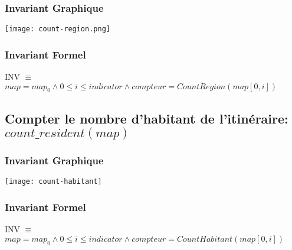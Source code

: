 \subsubsection{Invariant Graphique}

\addvspace{40px}
\begin{center}
    \texttt{[image: count-region.png]}
\end{center}
\addvspace{40px}

\subsubsection{Invariant Formel}

INV $\equiv$ $map=map_0 \land 0 \le i \le indicator \land compteur=CountRegion(map[0, i])$


\subsection{Compter le nombre d'habitant de l'itinéraire: $count\_resident(map)$}

\subsubsection{Invariant Graphique}

\addvspace{40px}
\begin{center}
    \texttt{[image: count-habitant]}
\end{center}
\addvspace{40px}

\subsubsection{Invariant Formel}

INV $\equiv$ $map=map_0 \land 0 \le i \le indicator \land compteur=CountHabitant(map[0, i])$


